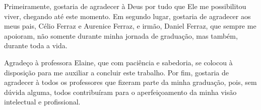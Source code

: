 \begin{agradecimentos}

Primeiramente, gostaria de agradecer à Deus por tudo que Ele me possibilitou viver, chegando até este momento. Em segundo lugar, gostaria de agradecer aos meus pais, Célio Ferraz e Aurenice Ferraz, e irmão, Daniel Ferraz, que sempre me apoioram, não somente durante minha jornada de graduação, mas também, durante toda a vida.

Agradeço à professora Elaine, que com paciência e sabedoria, se colocou à disposição para me auxiliar a concluir este trabalho. Por fim, gostaria de agradecer à todos os professores que fizeram parte da minha graduação, pois, sem dúvida alguma, todos contribuíram para o aperfeiçoamento da minha visão intelectual e profissional.

\end{agradecimentos}
